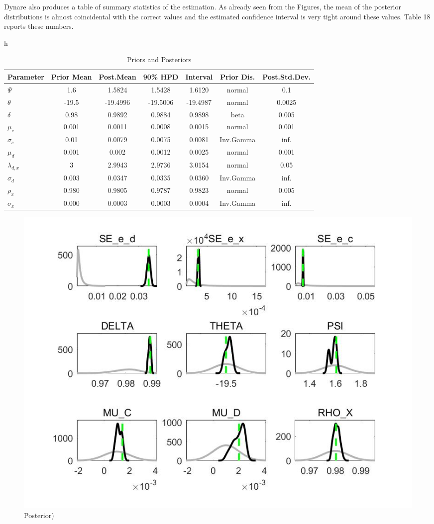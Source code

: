 \documentclass[a4paper,12pt]{scrartcl} %
\begin{document}
Dynare also produces a table of summary statistics of the estimation. As already seen from the Figures, the mean of the posterior distributions is almost coincidental with the correct values and the estimated confidence interval is very tight around these values. Table 18 reports these numbers.

\begin{table}{h}
\centering
\caption{Priors and Posteriors}\label{18}
\begin{tabular}{lcccccc}
\hline
Parameter&Prior Mean&Post.Mean&90\% HPD&Interval&Prior Dis.&Post.Std.Dev.\\
\hline
$\Psi$&1.6&1.5824&1.5428&1.6120&normal&0.1\\
$\theta$&-19.5&-19.4996&-19.5006&-19.4987&normal&0.0025\\
$\delta$&0.98&0.9892&0.9884&0.9898&beta&0.005\\
$\mu_c$&0.001&0.0011&0.0008&0.0015&normal&0.001\\
$\sigma_c$&0.01&0.0079&0.0075&0.0081&Inv.Gamma&inf.\\
$\mu_d$&0.001&0.002&0.0012&0.0025&normal&0.001\\
$\lambda_{d,x}$&3&2.9943&2.9736&3.0154&normal&0.05\\
$\sigma_d$&0.003&0.0347&0.0335&0.0360&Inv.Gamma&inf.\\
$\rho_x$&0.980&0.9805&0.9787&0.9823&normal&0.005\\
$\sigma_x$&0.000&0.0003&0.0003&0.0004&Inv.Gamma&inf.\\
\hline
\end{tabular}
\end{table}

\begin{figure}[htbp!]
		\centering
			\includegraphics[width=0.8\linewidth]{fig36.jpg}
            \caption{Posterior)}\label{36}
\end{figure}
\end{document}
